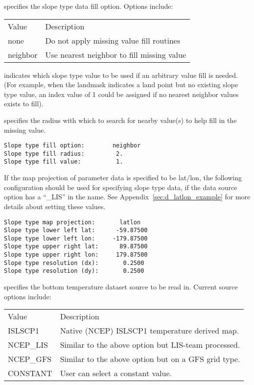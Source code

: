  
  specifies the slope type 
 data fill option.  Options include:

 \begin{tabular}{ll}
 Value    & Description                                \\
 none     & Do not apply missing value fill routines   \\
 neighbor & Use nearest neighbor to fill missing value \\
 \end{tabular}

  indicates which slope type 
 value to be used if an arbitrary value fill is needed. 
 (For example, when the landmask indicates a land point but no existing 
 slope type value, an index value of 1 could be assigned if 
 no nearest neighbor values exists to fill).

  specifies the radius with which
 to search for nearby value(s) to help fill in the missing value.
 

 \begin{Verbatim}[frame=single]
Slope type fill option:        neighbor
Slope type fill radius:         2.
Slope type fill value:          1.
 \end{Verbatim}

 
 If the map projection of parameter data is specified to be lat/lon, 
 the following configuration should be used for specifying slope type
 data, if the data source option has a ``\_LIS'' in the name.
 See Appendix~\ref{sec:d_latlon_example} for more details about
 setting these values.
 

 \begin{Verbatim}[frame=single]
Slope type map projection:       latlon
Slope type lower left lat:      -59.87500
Slope type lower left lon:     -179.87500
Slope type upper right lat:      89.87500
Slope type upper right lon:     179.87500
Slope type resolution (dx):       0.2500
Slope type resolution (dy):       0.2500
 \end{Verbatim}

 

  specifies the bottom temperature
 dataset source to be read in. Current source options include:

 \begin{tabular}{ll}
 Value         & Description    \\
 ISLSCP1       &  Native (NCEP) ISLSCP1 temperature derived map. \\
 NCEP\_LIS     &  Similar to the above option but LIS-team processed. \\
 NCEP\_GFS     &  Similar to the above option but on a GFS grid type. \\
 CONSTANT      &  User can select a constant value. \\
 \end{tabular}

